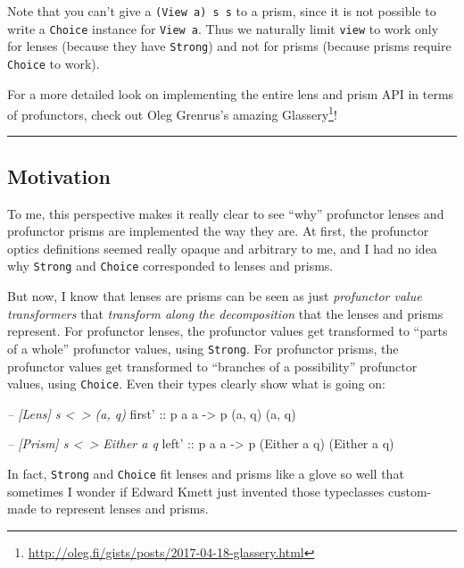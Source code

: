 \documentclass[]{article}
\newenvironment{Shaded}{}{}
\newcommand{\CommentTok}[1]{\textcolor[rgb]{0.38,0.63,0.69}{\textit{#1}}}
\newcommand{\DataTypeTok}[1]{\textcolor[rgb]{0.56,0.13,0.00}{#1}}
\newcommand{\NormalTok}[1]{#1}
\newcommand{\OtherTok}[1]{\textcolor[rgb]{0.00,0.44,0.13}{#1}}
\renewcommand{\href}[2]{#2\footnote{\url{#1}}}
\begin{document}
Note that you can't give a \texttt{(View\ a)\ s\ s} to a prism, since it is not
possible to write a \texttt{Choice} instance for \texttt{View\ a}. Thus we
naturally limit \texttt{view} to work only for lenses (because they have
\texttt{Strong}) and not for prisms (because prisms require \texttt{Choice} to
work).

For a more detailed look on implementing the entire lens and prism API in terms
of profunctors, check out Oleg Grenrus's amazing
\href{http://oleg.fi/gists/posts/2017-04-18-glassery.html}{Glassery}!

\begin{center}\rule{0.5\linewidth}{\linethickness}\end{center}

\hypertarget{motivation}{%
\subsection{Motivation}\label{motivation}}

To me, this perspective makes it really clear to see ``why'' profunctor lenses
and profunctor prisms are implemented the way they are. At first, the profunctor
optics definitions seemed really opaque and arbitrary to me, and I had no idea
why \texttt{Strong} and \texttt{Choice} corresponded to lenses and prisms.

But now, I know that lenses are prisms can be seen as just \emph{profunctor
value transformers} that \emph{transform along the decomposition} that the
lenses and prisms represent. For profunctor lenses, the profunctor values get
transformed to ``parts of a whole'' profunctor values, using \texttt{Strong}.
For profunctor prisms, the profunctor values get transformed to ``branches of a
possibility'' profunctor values, using \texttt{Choice}. Even their types clearly
show what is going on:

\begin{Shaded}
\begin{Highlighting}[]
\CommentTok{-- [Lens]  s <~> (a, q)}
\OtherTok{first' ::}\NormalTok{ p a a }\OtherTok{->}\NormalTok{ p (a, q) (a, q)}

\CommentTok{-- [Prism] s <~> Either a q}
\OtherTok{left'  ::}\NormalTok{ p a a }\OtherTok{->}\NormalTok{ p (}\DataTypeTok{Either}\NormalTok{ a q) (}\DataTypeTok{Either}\NormalTok{ a q)}
\end{Highlighting}
\end{Shaded}

In fact, \texttt{Strong} and \texttt{Choice} fit lenses and prisms like a glove
so well that sometimes I wonder if Edward Kmett just invented those typeclasses
custom-made to represent lenses and prisms.
\end{document}
